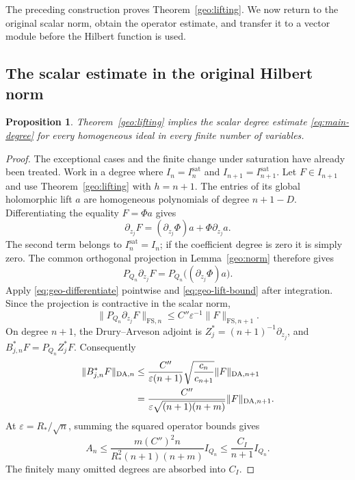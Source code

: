 \documentclass[11pt,reqno]{amsart}
\numberwithin{equation}{section}
\newtheorem{proposition}[theorem]{Proposition}
\theoremstyle{definition}
\theoremstyle{remark}
\newcommand{\FS}{\mathrm{FS}}
\newcommand{\DA}{\mathrm{DA}}
\begin{document}
The preceding construction proves Theorem~\ref{geo:lifting}. We now
return to the original scalar norm, obtain the operator estimate, and
transfer it to a vector module before the Hilbert function is used.

\subsection{The scalar estimate in the original Hilbert norm}
\begin{proposition}\label{geo:transfer}
Theorem~\ref{geo:lifting} implies the scalar degree estimate
\eqref{eq:main-degree} for every homogeneous ideal in every finite
number of variables.
\end{proposition}
\begin{proof}
The exceptional cases and the finite change under saturation have
already been treated.  Work in a degree where
$I_n=I_n^{\mathrm{sat}}$ and $I_{n+1}=I_{n+1}^{\mathrm{sat}}$.
Let $F\in I_{n+1}$ and use Theorem~\ref{geo:lifting} with $h=n+1$.
The entries of its global holomorphic lift $a$ are homogeneous
polynomials of degree $n+1-D$.  Differentiating the equality $F=\Phi a$
gives
\[
 \partial_{z_j}F=(\partial_{z_j}\Phi)a+\Phi\partial_{z_j}a.
\]
The second term belongs to $I_n^{\mathrm{sat}}=I_n$; if the
coefficient degree is zero it is simply zero.  The common orthogonal
projection in Lemma~\ref{geo:norm} therefore gives
\[
 P_{Q_n}\partial_{z_j}F
   =P_{Q_n}\bigl((\partial_{z_j}\Phi)a\bigr).
\]
Apply \eqref{eq:geo-differentiate} pointwise and
\eqref{eq:geo-lift-bound} after integration.  Since the projection is
contractive in the scalar norm,
\begin{equation}\label{eq:geo-projected-derivative}
 \|P_{Q_n}\partial_{z_j}F\|_{\FS,n}
       \le C''\varepsilon^{-1}\|F\|_{\FS,n+1}.
\end{equation}
On degree $n+1$, the Drury--Arveson adjoint is
$Z_j^*=(n+1)^{-1}\partial_{z_j}$, and
$B_{j,n}^*F=P_{Q_n}Z_j^*F$.  Consequently
\begin{align}
 \|B_{j,n}^*F\|_{\DA,n}
 &\le \frac{C''}{\varepsilon(n+1)}
       \sqrt{\frac{c_n}{c_{n+1}}}\|F\|_{\DA,n+1}\notag\\
 &=\frac{C''}{\varepsilon\sqrt{(n+1)(n+m)}}
       \|F\|_{\DA,n+1}.\label{eq:geo-exact-transfer}
\end{align}
At $\varepsilon=R_*/\sqrt n$, summing the squared operator bounds gives
\[
 A_n\le
 \frac{m(C'')^2n}{R_*^2(n+1)(n+m)}I_{Q_n}
 \le\frac{C_I}{n+1}I_{Q_n}.
\]
The finitely many omitted degrees are absorbed into $C_I$.
\end{proof}
\end{document}
